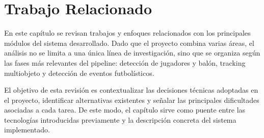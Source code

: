 \chapter{Trabajo Relacionado}
\label{cap:trabajoRelacionado}

En este capítulo se revisan trabajos y enfoques relacionados con los principales módulos del sistema desarrollado. Dado que el proyecto combina varias áreas, el análisis no se limita a una única línea de investigación, sino que se organiza según las fases más relevantes del pipeline: detección de jugadores y balón, tracking multiobjeto y detección de eventos futbolísticos.

El objetivo de esta revisión es contextualizar las decisiones técnicas adoptadas en el proyecto, identificar alternativas existentes y señalar las principales dificultades asociadas a cada tarea. De este modo, el capítulo sirve como puente entre las tecnologías introducidas previamente y la descripción concreta del sistema implementado.




